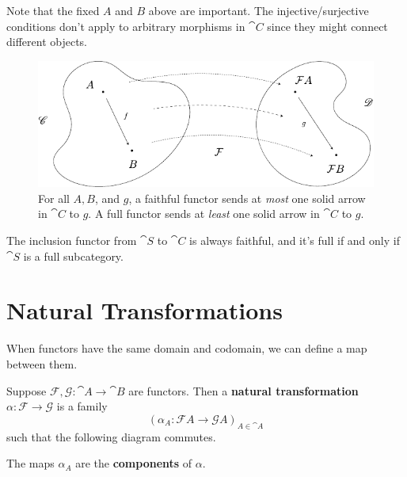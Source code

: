\documentclass[twoside,10pt]{report}
\begin{document}
Note that the fixed $A$ and $B$ above are important. The injective/surjective conditions don't apply to arbitrary morphisms in $\cat{C}$ since they might connect different objects.

\begin{figure}[H]
	\centering
	\includegraphics[scale=1]{fig/faith-full.pdf}
	\caption{For all $A, B$, and $g$, a faithful functor sends at \textit{most} one solid arrow in $\cat{C}$ to $g$. A full functor sends at \textit{least} one solid arrow in $\cat{C}$ to $g$.}
\end{figure}

\begin{ex}
The inclusion functor from $\cat{S}$ to $\cat{C}$ is always faithful, and it's full if and only if $\cat{S}$ is a full subcategory.
\end{ex}


\section{Natural Transformations}

When functors have the same domain and codomain, we can define a map between them.

\begin{defn}
Suppose $\mathcal{F},\mathcal{G}:\cat{A}\to \cat{B}$ are functors. Then a \textbf{natural transformation} $\alpha:\mathcal{F}\to \mathcal{G}$ is a family
\[
	(\alpha_A: \mathcal{F}A \to \mathcal{G}A)_{A \in \cat{A}}
\] such that the following diagram commutes.
\begin{figure}[H]
	\centering
{}
\end{figure}

The maps $\alpha_A$ are the \textbf{components} of $\alpha$.
\end{defn}
\end{document}
